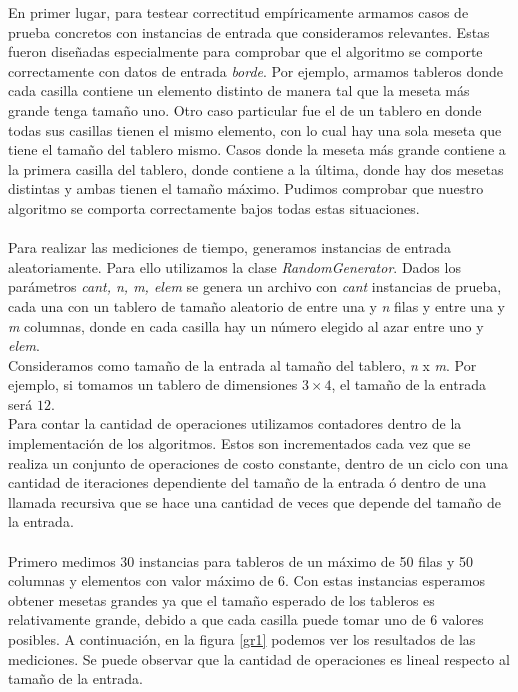 \documentclass[10pt, a4paper,english,spanish]{article}
\begin{document}
\indent En primer lugar, para testear correctitud empíricamente armamos casos de prueba concretos con instancias de entrada que consideramos relevantes. 
Estas fueron diseñadas especialmente para comprobar que el algoritmo se comporte correctamente con datos de entrada \textit{borde}. 
Por ejemplo, armamos tableros donde cada casilla contiene un elemento distinto de manera tal que la meseta más grande tenga tamaño uno. 
Otro caso particular fue el de un tablero en donde todas sus casillas tienen el mismo elemento, con lo cual hay una sola meseta que tiene el 
tamaño del tablero mismo. Casos donde la meseta más grande contiene a la primera casilla del tablero, donde contiene a la última, donde 
hay dos mesetas distintas y ambas tienen el tamaño máximo. Pudimos comprobar que nuestro algoritmo se comporta correctamente bajos todas 
estas situaciones.
\\\\
\indent Para realizar las mediciones de tiempo, generamos instancias de entrada aleatoriamente. Para ello utilizamos 
la clase \textit{RandomGenerator}. Dados los parámetros \textit{cant, n, m, elem} se genera un archivo con \textit{cant} instancias de 
prueba, cada una con un tablero de tamaño aleatorio de entre una y \textit{n} filas y entre una y \textit{m} columnas, 
donde en cada casilla hay un número elegido al azar entre uno y \textit{elem}. 
\\
\indent Consideramos como tamaño de la entrada al tamaño del tablero, \textit{n} x \textit{m}. Por ejemplo, si tomamos un tablero de 
dimensiones $3 \times 4$, el tamaño de la entrada será $12$. 
\\
\indent Para contar la cantidad de operaciones utilizamos contadores dentro 
de la implementación de los algoritmos. 
Estos son incrementados cada vez que se realiza un conjunto de operaciones de costo constante, dentro de un ciclo
con una cantidad de iteraciones dependiente del tamaño de la entrada ó dentro de una llamada recursiva que se hace 
una cantidad de veces que depende del tamaño de la entrada. 
\\\\
\indent Primero medimos 30 instancias para tableros de un máximo de 50 filas y 50 columnas y elementos con valor máximo de 6. 
Con estas instancias esperamos obtener mesetas grandes ya que el tamaño esperado de los tableros es relativamente grande, debido a
que cada casilla puede tomar uno de 6 valores posibles. A continuación, en la figura \ref{gr1} podemos ver los resultados de las mediciones. 
Se puede observar que la cantidad de operaciones es lineal respecto al tamaño de la entrada.
\end{document}
